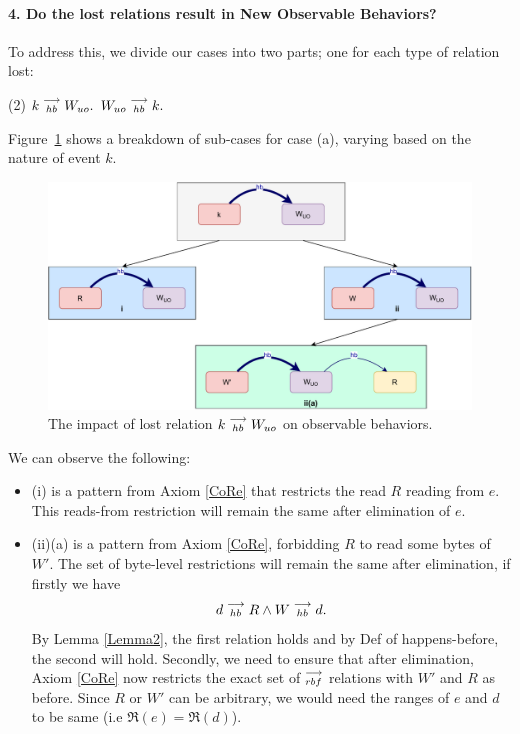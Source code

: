 \paragraph{4. Do the lost relations result in New Observable Behaviors?}

    To address this, we divide our cases into two parts; one for each type of relation lost:
    \begin{tasks}(2)
        \task $k\stackrel{\longrightarrow}{_{hb}}W_{uo}.$
        \task $W_{uo}\stackrel{\longrightarrow}{_{hb}}k.$
    \end{tasks}

    Figure~\ref{elim_write:case1} shows a breakdown of sub-cases for case (a), varying based
    on the nature of event $k$.
    \begin{figure}[H]
        \centering
        \includegraphics[scale=0.5]{6.Elimination/1.ValidEliminationCandidate/WriteElimProof/ProofParts/Part4Case1.pdf}
        \caption{The impact of lost relation $k\stackrel{\longrightarrow}{_{hb}}W_{uo}$ on observable behaviors.}
        \label{elim_write:case1}
    \end{figure}

    We can observe the following:
    \begin{itemize}
        \item (i) is a pattern from Axiom \ref{CoRe} that restricts the read $R$ reading from $e$. This reads-from restriction will remain the same after elimination of $e$. 
        \item (ii)(a) is a pattern from Axiom \ref{CoRe}, forbidding $R$ to read some bytes of $W'$. 
        The set of byte-level restrictions will remain the same after elimination, if firstly we have 
        \begin{align*}
            d\stackrel{\longrightarrow}{_{hb}}R \wedge W\stackrel{\longrightarrow}{_{hb}}d.
        \end{align*}
        By Lemma \ref{Lemma2}, the first relation holds and by Def of happens-before, the second will hold. 
        Secondly, we need to ensure that after elimination, Axiom \ref{CoRe} now restricts the exact set of $\stackrel{\longrightarrow}{_{rbf}}$ relations with $W'$ and $R$ as before. 
        Since $R$ or $W'$ can be arbitrary, we would need the ranges of $e$ and $d$ to be same (i.e $\Re(e) = \Re(d)$).
    \end{itemize}

